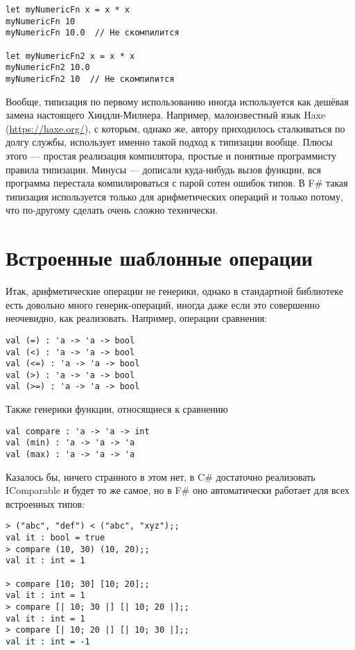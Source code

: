 \documentclass{../../text-style}
\begin{document}
\begin{verbatim}
let myNumericFn x = x * x
myNumericFn 10
myNumericFn 10.0  // Не скомпилится

let myNumericFn2 x = x * x
myNumericFn2 10.0
myNumericFn2 10  // Не скомпилится
\end{verbatim}

Вообще, типизация по первому использованию иногда используется как дешёвая замена настоящего Хиндли-Милнера. Например, малоизвестный язык Haxe (\url{https://haxe.org/}), с которым, однако же, автору приходилось сталкиваться по долгу службы, использует именно такой подход к типизации вообще. Плюсы этого --- простая реализация компилятора, простые и понятные программисту правила типизации. Минусы --- дописали куда-нибудь вызов функции, вся программа перестала компилироваться с парой сотен ошибок типов. В F\# такая типизация используется только для арифметических операций и только потому, что по-другому сделать очень сложно технически.

\section{Встроенные шаблонные операции}

Итак, арифметические операции не генерики, однако в стандартной библиотеке есть довольно много генерик-операций, иногда даже если это совершенно неочевидно, как реализовать. Например, операции сравнения:

\begin{verbatim}
val (=) : 'a -> 'a -> bool
val (<) : 'a -> 'a -> bool
val (<=) : 'a -> 'a -> bool
val (>) : 'a -> 'a -> bool
val (>=) : 'a -> 'a -> bool
\end{verbatim}

Также генерики функции, относящиеся к сравнению

\begin{verbatim}
val compare : 'a -> 'a -> int
val (min) : 'a -> 'a -> 'a
val (max) : 'a -> 'a -> 'a
\end{verbatim}

Казалось бы, ничего странного в этом нет, в C\# достаточно реализовать IComparable и будет то же самое, но в F\# оно автоматически работает для всех встроенных типов:

\begin{verbatim}
> ("abc", "def") < ("abc", "xyz");;
val it : bool = true
> compare (10, 30) (10, 20);;
val it : int = 1

> compare [10; 30] [10; 20];;
val it : int = 1
> compare [| 10; 30 |] [| 10; 20 |];;
val it : int = 1
> compare [| 10; 20 |] [| 10; 30 |];;
val it : int = -1
\end{verbatim}
\end{document}

